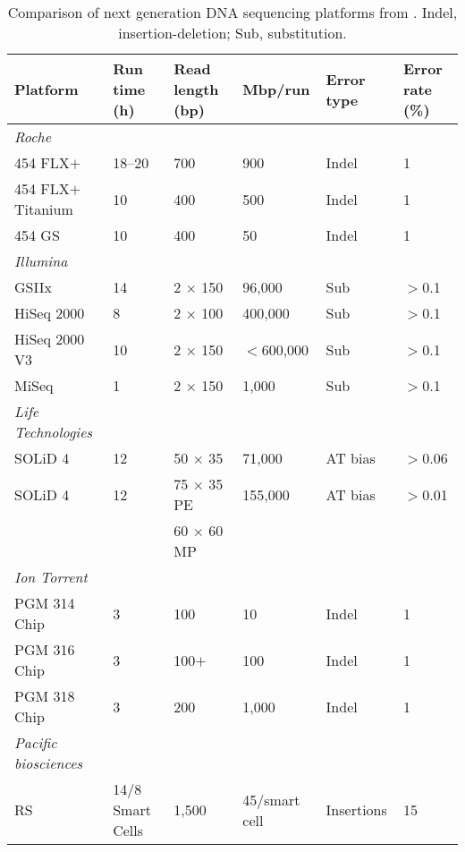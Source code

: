 \begin{table}
\footnotesize
\caption[Comparison of next generation \textsc{DNA} sequencing platforms]{Comparison of next generation \textsc{DNA} sequencing platforms from \citet{Scholz2012}. Indel, insertion-deletion; Sub, substitution.
}
\label{tab:seq_tech}
\smallskip
\begin{tabularx}{\textwidth}{p{3cm}p{2.5cm}XXp{1.5cm}p{1.2cm}}
\toprule
\textbf{Platform} & \textbf{Run time (h)} & \textbf{Read length (bp)} & \textbf{Mbp/run} & \textbf{Error type} & \textbf{Error rate (\%)} \\
\midrule
\emph{Roche}             &        &                   &            &              &   \\
454 FLX$+$               & 18--20 & 700               & 900        & Indel        & 1 \\
454 FLX$+$ Titanium      &  10    & 400               & 500        & Indel        & 1 \\
454 GS                   &  10    & 400               & 50         & Indel        & 1 \\
\emph{Illumina}          &        &                   &            &              &  \\
GSIIx                    & 14     & 2 $\times$ 150    & 96,000     & Sub          & $>$0.1 \\
HiSeq 2000               & 8      & 2 $\times$ 100    & 400,000    & Sub          & $>$0.1 \\
HiSeq 2000 V3            & 10     & 2 $\times$ 150    & $<$600,000 & Sub          & $>$0.1 \\
MiSeq                    & 1      & 2 $\times$ 150    & 1,000      & Sub          & $>$0.1 \\
\emph{Life Technologies} &  &  &  &  &  \\
SOLiD 4                  & 12     & 50 $\times$ 35    & 71,000     & AT bias     & $>$0.06 \\
SOLiD 4                  & 12     & 75 $\times$ 35 PE & 155,000    & AT bias     & $>$0.01 \\
                         &        & 60 $\times$ 60 MP &            &             &  \\
\emph{Ion Torrent}       &        &                   &            &             &  \\
PGM 314 Chip             & 3      & 100               & 10         &  Indel      & 1 \\
PGM 316 Chip             & 3      & 100$+$            & 100        &  Indel      & 1 \\
PGM 318 Chip             & 3      & 200               & 1,000      &  Indel      & 1 \\
\emph{Pacific biosciences} &  &  &  &  &  \\
RS                       & 14/8 Smart Cells & 1,500 & 45/smart cell &  Insertions & 15 \\
\bottomrule
\end{tabularx}
\end{table}
